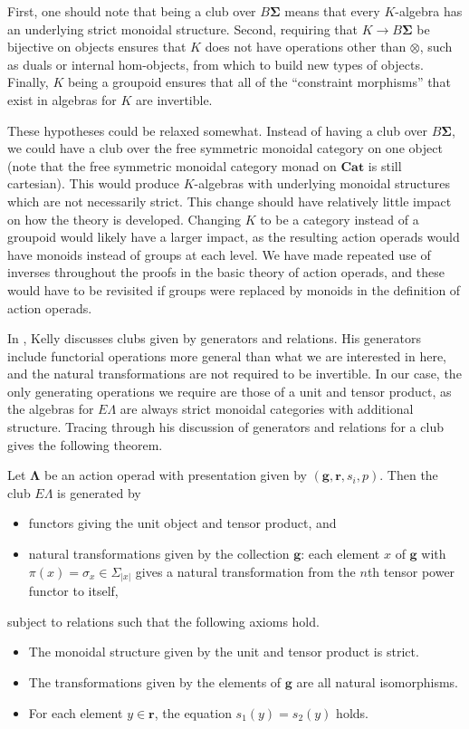 \documentclass{amsbook} %
\newcommand{\mb}{\mathbf}
\numberwithin{section}{chapter}
\begin{document}
\begin{rem}
First, one should note that being a club over $B \mb{\Sigma}$ means that every $K$-algebra has an underlying strict monoidal structure.  Second, requiring that $K \rightarrow B \mb{\Sigma}$ be bijective on objects ensures that $K$ does not have  operations other than $\otimes$, such as duals or internal hom-objects, from which to build new types of objects.  Finally, $K$ being a groupoid ensures that all of the ``constraint morphisms'' that exist in algebras for $K$ are invertible.

These hypotheses could be relaxed somewhat.  Instead of having a club over $B \mb{\Sigma}$, we could have a club over the free symmetric monoidal category on one object (note that the free symmetric monoidal category monad on $\mb{Cat}$ is still cartesian).  This would produce $K$-algebras with underlying monoidal structures which are not necessarily strict.  This change should have relatively little impact on how the theory is developed.  Changing $K$ to be a category instead of a groupoid would likely have a larger impact, as the resulting action operads would have monoids instead of groups at each level.  We have made repeated use of inverses throughout the proofs in the basic theory of action operads, and these would have to be revisited if groups were replaced by monoids in the definition of action operads.
\end{rem}

In \cite{kelly_club1}, Kelly discusses clubs given by generators and relations.  His generators include functorial operations more general than what we are interested in here, and the natural transformations are not required to be invertible.  In our case, the only generating operations we require are those of a unit and tensor product, as the algebras for $E\Lambda$ are always strict monoidal categories with additional structure.  Tracing through his discussion of generators and relations for a club gives the following theorem.

\begin{thm}\label{pres1}
Let $\mb{\Lambda}$ be an action operad with presentation given by $(\mathbf{g},\mathbf{r}, s_{i}, p)$.  Then the club $E\Lambda$ is generated by
\begin{itemize}
\item functors giving the unit object and tensor product, and
\item natural transformations given by the collection $\mathbf{g}$:  each element $x$ of $\mathbf{g}$ with $\pi(x) = \sigma_{x} \in \Sigma_{|x|}$ gives a natural transformation from the $n$th tensor power functor to itself,
\end{itemize}
subject to relations such that the following axioms hold.
\begin{itemize}
\item The monoidal structure given by the unit and tensor product is strict.
\item The transformations given by the elements of $\mathbf{g}$ are all natural isomorphisms.
\item For each element $y \in \mathbf{r}$, the equation $s_{1}(y) = s_{2}(y)$ holds.
\end{itemize}
\end{thm}
\end{document}
